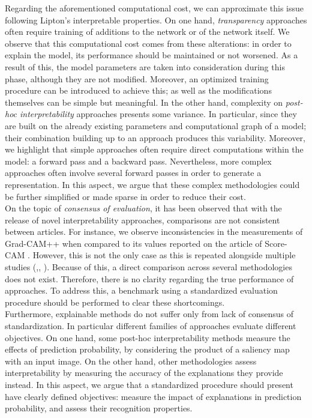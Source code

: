 \noindent Regarding the aforementioned computational cost, we can approximate this issue following 
Lipton's interpretable properties. On one hand, \emph{transparency} approaches often require 
training of additions to the network or of the network itself. We observe that this computational 
cost comes from these alterations: in order to explain the model, its performance should 
be maintained or not worsened. As a result of this, the model parameters are taken into 
consideration during this phase, although they are not modified. Moreover, an optimized training 
procedure can be introduced to achieve this; as well as the modifications themselves can be simple 
but meaningful. In the other hand, complexity on \emph{post-hoc interpretability} approaches 
presents some variance. In particular, since they are built on the already existing parameters 
and computational graph of a model; their combination building up to an approach produces this 
variability. Moreover, we highlight that simple approaches often require direct computations within 
the model: a forward pass and a backward pass. Nevertheless, more complex approaches often involve 
several forward passes in order to generate a representation. In this aspect, we argue that these 
complex methodologies could be further simplified or made sparse in order to reduce their cost.\\

\noindent On the topic of \emph{consensus of evaluation}, it has been observed that with the 
release of novel interpretability approaches, comparisons are not consistent between articles. For 
instance, we observe inconsistencies in the measurements of Grad-CAM++ 
\autocite{chattopadhay2018grad} when compared to its values reported on the article of Score-CAM 
\autocite{wang2020score}. However, this is not the only case as this is repeated alongside multiple 
studies (\cite{lee2021lfi},\cite{wang2020ss}, \cite{naidu2020cam}). Because of this, a direct 
comparison across several methodologies does not exist. Therefore, there is no clarity 
regarding the true performance of approaches. To address this, a benchmark using a standardized 
evaluation procedure should be performed to clear these shortcomings.\\

\noindent Furthermore, explainable methods do not suffer only from lack of consensus of 
standardization. In particular different families of approaches evaluate different objectives. On 
one hand, some post-hoc interpretability methods measure the effects of prediction probability, 
by considering the product of a saliency map with an input image. On the other hand, 
other methodologies assess interpretability by measuring the accuracy of the explanations they 
provide instead. In this aspect, we argue that a standardized procedure should present have 
clearly defined objectives: measure the impact of explanations in prediction probability, and 
assess their recognition properties.\\

